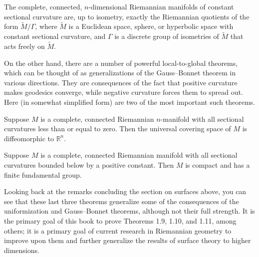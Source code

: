 \begin{theorem}
\label{thm:characterization-constant-curvature}
\notready
The complete, connected, $n$-dimensional Riemannian manifolds of constant sectional curvature are, up to isometry, exactly the Riemannian quotients of the form $\widetilde{M}/\Gamma$, where $\widetilde{M}$ is a Euclidean space, sphere, or hyperbolic space with constant sectional curvature, and $\Gamma$ is a discrete group of isometries of $\widetilde{M}$ that acts freely on $\widetilde{M}$.
\end{theorem}

On the other hand, there are a number of powerful local-to-global theorems, which can be thought of as generalizations of the Gauss--Bonnet theorem in various directions. They are consequences of the fact that positive curvature makes geodesics converge, while negative curvature forces them to spread out. Here (in somewhat simplified form) are two of the most important such theorems.

\begin{theorem}
\label{thm:cartan-hadamard-preview}
\notready
Suppose $M$ is a complete, connected Riemannian $n$-manifold with all sectional curvatures less than or equal to zero. Then the universal covering space of $M$ is diffeomorphic to $\mathbb{R}^n$.
\end{theorem}

\begin{theorem}[Myers]
\label{thm:myers}
\notready
Suppose $M$ is a complete, connected Riemannian manifold with all sectional curvatures bounded below by a positive constant. Then $M$ is compact and has a finite fundamental group.
\end{theorem}

Looking back at the remarks concluding the section on surfaces above, you can see that these last three theorems generalize some of the consequences of the uniformization and Gauss--Bonnet theorems, although not their full strength. It is the primary goal of this book to prove Theorems 1.9, 1.10, and 1.11, among others; it is a primary goal of current research in Riemannian geometry to improve upon them and further generalize the results of surface theory to higher dimensions.